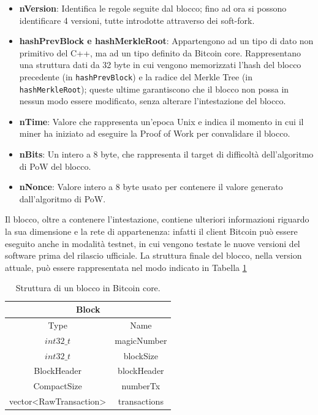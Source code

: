 \begin{itemize}
  \item {\bf nVersion\/}: Identifica le regole seguite dal blocco; fino ad ora si possono identificare 4 versioni, tutte introdotte attraverso dei soft-fork.
  \item {\bf hashPrevBlock e hashMerkleRoot\/}: Appartengono ad un tipo di dato non primitivo del C++, ma ad un tipo definito da Bitcoin core. Rappresentano una struttura dati da 32 byte in cui vengono memorizzati l’hash del blocco precedente (in {\tt{hashPrevBlock}}) e la radice del Merkle Tree (in {\tt{hashMerkleRoot}}); queste ultime garantiscono che il blocco non possa in nessun modo essere modificato, senza alterare l’intestazione del blocco.
  \item {\bf nTime\/}: Valore che rappresenta un’epoca Unix e indica il momento in cui il miner ha iniziato ad eseguire la Proof of Work per convalidare il blocco.
  \item {\bf nBits\/}: Un intero a 8 byte, che rappresenta il target di difficoltà dell’algoritmo di PoW del blocco.
  \item {\bf nNonce\/}: Valore intero a 8 byte usato per contenere il valore generato dall’algoritmo di PoW.
\end{itemize}

Il blocco, oltre a contenere l’intestazione, contiene ulteriori informazioni riguardo la sua dimensione e la rete di appartenenza: infatti il client Bitcoin può essere eseguito anche in modalità testnet, in cui vengono testate le nuove versioni del software prima del rilascio ufficiale.
La struttura finale del blocco, nella version attuale, può essere rappresentata nel modo indicato in Tabella \ref{tab:blockbitcoinc}

\begin{table}
       \centering\small
           \begin{tabular}{|c|c|}
               \hline
                 \multicolumn{2}{|c|}{\textbf{Block}} \\
                 \hline
                 \multicolumn{1}{|c|}{Type} & \multicolumn{1}{c|}{Name} \\
               \hline \hline
               $int32\_t$ & magicNumber   \\
               \hline
               $int32\_t$ & blockSize \\
               \hline
               BlockHeader & blockHeader \\
               \hline
               CompactSize & numberTx \\
               \hline
               vector<RawTransaction> & transactions \\
               \hline
       \end{tabular}
       \caption{Struttura di un blocco in Bitcoin core.\label{tab:blockbitcoinc}}
   \end{table}

